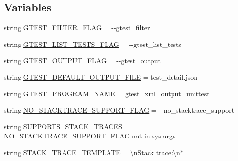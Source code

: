 \subsection*{Variables}
\begin{DoxyCompactItemize}
\item 
string \mbox{\hyperlink{namespacegoogletest-json-output-unittest_a78119267ed683b37bd90af318fb29136}{G\+T\+E\+S\+T\+\_\+\+F\+I\+L\+T\+E\+R\+\_\+\+F\+L\+AG}} = \textquotesingle{}-\/-\/gtest\+\_\+filter\textquotesingle{}
\item 
string \mbox{\hyperlink{namespacegoogletest-json-output-unittest_a1a5125bd96035d59b431fca5acb10b37}{G\+T\+E\+S\+T\+\_\+\+L\+I\+S\+T\+\_\+\+T\+E\+S\+T\+S\+\_\+\+F\+L\+AG}} = \textquotesingle{}-\/-\/gtest\+\_\+list\+\_\+tests\textquotesingle{}
\item 
string \mbox{\hyperlink{namespacegoogletest-json-output-unittest_addc3fef6d837287e9d52447a7fd4ec6e}{G\+T\+E\+S\+T\+\_\+\+O\+U\+T\+P\+U\+T\+\_\+\+F\+L\+AG}} = \textquotesingle{}-\/-\/gtest\+\_\+output\textquotesingle{}
\item 
string \mbox{\hyperlink{namespacegoogletest-json-output-unittest_a6993deaa84410f54cfa9739f91998ab3}{G\+T\+E\+S\+T\+\_\+\+D\+E\+F\+A\+U\+L\+T\+\_\+\+O\+U\+T\+P\+U\+T\+\_\+\+F\+I\+LE}} = \textquotesingle{}test\+\_\+detail.\+json\textquotesingle{}
\item 
string \mbox{\hyperlink{namespacegoogletest-json-output-unittest_a2ea5e671c35eb461f41c0a5d720fed9d}{G\+T\+E\+S\+T\+\_\+\+P\+R\+O\+G\+R\+A\+M\+\_\+\+N\+A\+ME}} = \textquotesingle{}gtest\+\_\+xml\+\_\+output\+\_\+unittest\+\_\+\textquotesingle{}
\item 
string \mbox{\hyperlink{namespacegoogletest-json-output-unittest_a6ddd6eb87b18fe709a35787ad5a2cceb}{N\+O\+\_\+\+S\+T\+A\+C\+K\+T\+R\+A\+C\+E\+\_\+\+S\+U\+P\+P\+O\+R\+T\+\_\+\+F\+L\+AG}} = \textquotesingle{}-\/-\/no\+\_\+stacktrace\+\_\+support\textquotesingle{}
\item 
string \mbox{\hyperlink{namespacegoogletest-json-output-unittest_a6dfc09d904d4cafa17a375a9b1d579bf}{S\+U\+P\+P\+O\+R\+T\+S\+\_\+\+S\+T\+A\+C\+K\+\_\+\+T\+R\+A\+C\+ES}} = \mbox{\hyperlink{namespacegoogletest-json-output-unittest_a6ddd6eb87b18fe709a35787ad5a2cceb}{N\+O\+\_\+\+S\+T\+A\+C\+K\+T\+R\+A\+C\+E\+\_\+\+S\+U\+P\+P\+O\+R\+T\+\_\+\+F\+L\+AG}} not in sys.\+argv
\item 
string \mbox{\hyperlink{namespacegoogletest-json-output-unittest_aad22fa1a2c6606dc4914336e1be8abb9}{S\+T\+A\+C\+K\+\_\+\+T\+R\+A\+C\+E\+\_\+\+T\+E\+M\+P\+L\+A\+TE}} = \textquotesingle{}\textbackslash{}n\+Stack trace\+:\textbackslash{}n$\ast$\textquotesingle{}

\end{DoxyCompactItemize}
